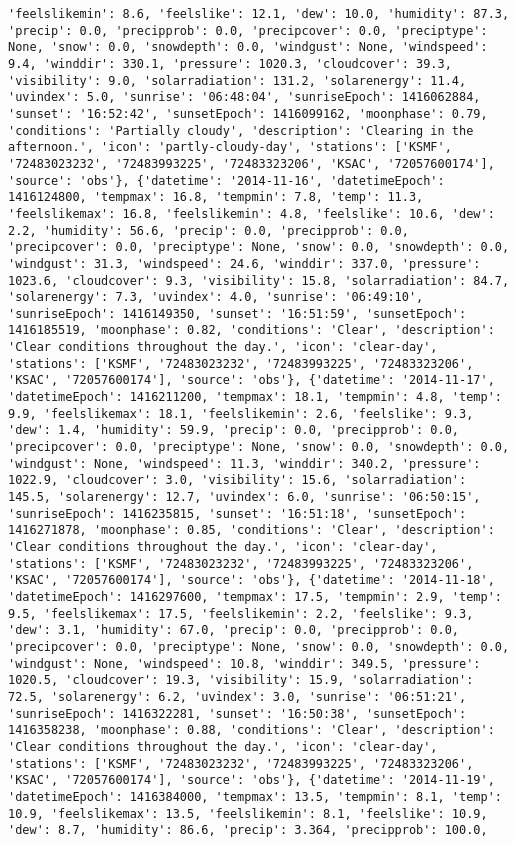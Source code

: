 \documentclass[
  letterpaper,
  DIV=11,
  numbers=noendperiod]{scrartcl}
\begin{document}
\begin{verbatim}
'feelslikemin': 8.6, 'feelslike': 12.1, 'dew': 10.0, 'humidity': 87.3, 'precip': 0.0, 'precipprob': 0.0, 'precipcover': 0.0, 'preciptype': None, 'snow': 0.0, 'snowdepth': 0.0, 'windgust': None, 'windspeed': 9.4, 'winddir': 330.1, 'pressure': 1020.3, 'cloudcover': 39.3, 'visibility': 9.0, 'solarradiation': 131.2, 'solarenergy': 11.4, 'uvindex': 5.0, 'sunrise': '06:48:04', 'sunriseEpoch': 1416062884, 'sunset': '16:52:42', 'sunsetEpoch': 1416099162, 'moonphase': 0.79, 'conditions': 'Partially cloudy', 'description': 'Clearing in the afternoon.', 'icon': 'partly-cloudy-day', 'stations': ['KSMF', '72483023232', '72483993225', '72483323206', 'KSAC', '72057600174'], 'source': 'obs'}, {'datetime': '2014-11-16', 'datetimeEpoch': 1416124800, 'tempmax': 16.8, 'tempmin': 7.8, 'temp': 11.3, 'feelslikemax': 16.8, 'feelslikemin': 4.8, 'feelslike': 10.6, 'dew': 2.2, 'humidity': 56.6, 'precip': 0.0, 'precipprob': 0.0, 'precipcover': 0.0, 'preciptype': None, 'snow': 0.0, 'snowdepth': 0.0, 'windgust': 31.3, 'windspeed': 24.6, 'winddir': 337.0, 'pressure': 1023.6, 'cloudcover': 9.3, 'visibility': 15.8, 'solarradiation': 84.7, 'solarenergy': 7.3, 'uvindex': 4.0, 'sunrise': '06:49:10', 'sunriseEpoch': 1416149350, 'sunset': '16:51:59', 'sunsetEpoch': 1416185519, 'moonphase': 0.82, 'conditions': 'Clear', 'description': 'Clear conditions throughout the day.', 'icon': 'clear-day', 'stations': ['KSMF', '72483023232', '72483993225', '72483323206', 'KSAC', '72057600174'], 'source': 'obs'}, {'datetime': '2014-11-17', 'datetimeEpoch': 1416211200, 'tempmax': 18.1, 'tempmin': 4.8, 'temp': 9.9, 'feelslikemax': 18.1, 'feelslikemin': 2.6, 'feelslike': 9.3, 'dew': 1.4, 'humidity': 59.9, 'precip': 0.0, 'precipprob': 0.0, 'precipcover': 0.0, 'preciptype': None, 'snow': 0.0, 'snowdepth': 0.0, 'windgust': None, 'windspeed': 11.3, 'winddir': 340.2, 'pressure': 1022.9, 'cloudcover': 3.0, 'visibility': 15.6, 'solarradiation': 145.5, 'solarenergy': 12.7, 'uvindex': 6.0, 'sunrise': '06:50:15', 'sunriseEpoch': 1416235815, 'sunset': '16:51:18', 'sunsetEpoch': 1416271878, 'moonphase': 0.85, 'conditions': 'Clear', 'description': 'Clear conditions throughout the day.', 'icon': 'clear-day', 'stations': ['KSMF', '72483023232', '72483993225', '72483323206', 'KSAC', '72057600174'], 'source': 'obs'}, {'datetime': '2014-11-18', 'datetimeEpoch': 1416297600, 'tempmax': 17.5, 'tempmin': 2.9, 'temp': 9.5, 'feelslikemax': 17.5, 'feelslikemin': 2.2, 'feelslike': 9.3, 'dew': 3.1, 'humidity': 67.0, 'precip': 0.0, 'precipprob': 0.0, 'precipcover': 0.0, 'preciptype': None, 'snow': 0.0, 'snowdepth': 0.0, 'windgust': None, 'windspeed': 10.8, 'winddir': 349.5, 'pressure': 1020.5, 'cloudcover': 19.3, 'visibility': 15.9, 'solarradiation': 72.5, 'solarenergy': 6.2, 'uvindex': 3.0, 'sunrise': '06:51:21', 'sunriseEpoch': 1416322281, 'sunset': '16:50:38', 'sunsetEpoch': 1416358238, 'moonphase': 0.88, 'conditions': 'Clear', 'description': 'Clear conditions throughout the day.', 'icon': 'clear-day', 'stations': ['KSMF', '72483023232', '72483993225', '72483323206', 'KSAC', '72057600174'], 'source': 'obs'}, {'datetime': '2014-11-19', 'datetimeEpoch': 1416384000, 'tempmax': 13.5, 'tempmin': 8.1, 'temp': 10.9, 'feelslikemax': 13.5, 'feelslikemin': 8.1, 'feelslike': 10.9, 'dew': 8.7, 'humidity': 86.6, 'precip': 3.364, 'precipprob': 100.0, 
\end{verbatim}
\end{document}
